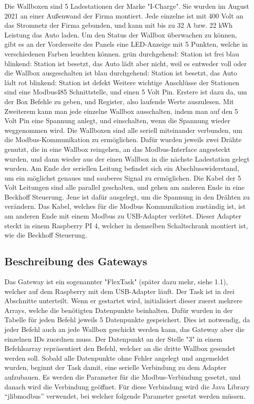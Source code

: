 Die Wallboxen sind 5 Ladestationen der Marke "I-Charge". Sie wurden im August 2021 an einer Außenwand der Firma montiert. Jede einzelne ist mit 400 Volt an das Stromnetz der Firma gebunden, und kann mit bis zu 32 A bzw. 22 kWh Leistung das Auto laden. Um den Status der Wallbox überwachen zu können, gibt es an der Vorderseite des Panels eine LED-Anzeige mit 5 Punkten, welche in verschiedenen Farben leuchten können. 
grün durchgehend: Station ist frei 
blau blinkend: Station ist besetzt, das Auto lädt aber nicht, weil es entweder voll oder die Wallbox ausgeschalten ist 
blau durchgehend: Station ist besetzt, das Auto lädt 
rot blinkend: Station ist defekt 
Weitere wichtige Anschlüsse der Stationen sind eine Modbus485 Schnittstelle, und einen 5 Volt Pin. 
Erstere ist dazu da, um der Box Befehle zu geben, und Register, also laufende Werte auszulesen. Mit Zweiterem kann man jede einzelne Wallbox ausschalten, indem man auf den 5 Volt Pin eine Spannung anlegt, und einschalten, wenn die Spannung wieder weggenommen wird. 
Die Wallboxen sind alle seriell miteinander verbunden, um die Modbus-Kommunikation zu ermöglichen. Dafür wurden jeweils zwei Drähte genutzt, die in eine Wallbox reingehen, an das Modbus-Interface angesteckt wurden, und dann wieder aus der einen Wallbox in die nächste Ladestation gelegt wurden. Am Ende der seriellen Leitung befindet sich ein Abschlusswiderstand, um ein möglichst genaues und sauberes Signal zu ermöglichen. Die Kabel der 5 Volt Leitungen sind alle parallel geschalten, und gehen am anderen Ende in eine Beckhoff Steuerung. Jene ist dafür ausgelegt, um die Spannung in den Drähten zu verändern. 
Das Kabel, welches für die Modbus Kommunikation zuständig ist, ist am anderen Ende mit einem Modbus zu USB-Adapter verlötet. Dieser Adapter steckt in einem Raspberry PI 4, welcher in demselben Schaltschrank montiert ist, wie die Beckhoff Steuerung. 


\subsection{Beschreibung des Gateways}
Das Gateway ist ein sogenannter "FlexTask" (später dazu mehr, siehe 1.1), welcher auf dem Raspberry mit dem USB-Adapter läuft. Der Task ist in drei Abschnitte unterteilt. Wenn er gestartet wird, initialisiert dieser zuerst mehrere Arrays, welche die benötigten Datenpunkte beinhalten. Dafür wurden in der Tabelle für jeden Befehl jeweils 5 Datenpunkte gespeichert. Dies ist notwendig, da jeder Befehl auch an jede Wallbox geschickt werden kann, das Gateway aber die einzelnen IDs zuordnen muss. Der Datenpunkt an der Stelle "3" in einem Befehlsarray repräsentiert den Befehl, welcher an die dritte Wallbox gesendet werden soll. 
Sobald alle Datenpunkte ohne Fehler angelegt und angemeldet wurden, beginnt der Task damit, eine serielle Verbindung zu dem Adapter aufzubauen.  Es werden die Parameter für die Modbus-Verbindung gesetzt, und danach wird die Verbindung geöffnet. Für diese Verbindung wird die Java Library “jlibmodbus” verwendet, bei welcher folgende Parameter gesetzt werden müssen. 


